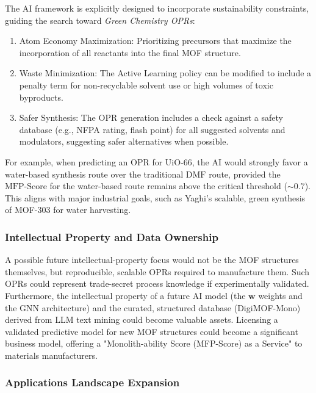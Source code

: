 \documentclass[12pt,a4paper]{article}
\begin{document}
The AI framework is explicitly designed to incorporate sustainability constraints, guiding the search toward \textit{Green Chemistry OPRs}:
\begin{enumerate}
    \item Atom Economy Maximization: Prioritizing precursors that maximize the incorporation of all reactants into the final MOF structure.
    \item Waste Minimization: The Active Learning policy can be modified to include a penalty term for non-recyclable solvent use or high volumes of toxic byproducts.
    \item Safer Synthesis: The OPR generation includes a check against a safety database (e.g., NFPA rating, flash point) for all suggested solvents and modulators, suggesting safer alternatives when possible.
\end{enumerate}
For example, when predicting an OPR for $\text{UiO-66}$, the AI would strongly favor a water-based synthesis route\cite{ref41} over the traditional $\text{DMF}$ route, provided the $\text{MFP-Score}$ for the water-based route remains above the critical threshold ($\sim 0.7$). This aligns with major industrial goals, such as Yaghi's scalable, green synthesis of MOF-303 for water harvesting.\cite{ref42}

\subsubsection{Intellectual Property and Data Ownership}

A possible future intellectual-property focus would not be the MOF structures themselves, but reproducible, scalable OPRs required to manufacture them. Such OPRs could represent trade-secret process knowledge if experimentally validated. Furthermore, the intellectual property of a future AI model (the $\mathbf{w}$ weights and the GNN architecture) and the curated, structured database (DigiMOF-Mono)\cite{ref16} derived from LLM text mining\cite{ref3} could become valuable assets. Licensing a validated predictive model for new MOF structures could become a significant business model, offering a "Monolith-ability Score (MFP-Score) as a Service" to materials manufacturers.

\subsubsection{Applications Landscape Expansion}
\end{document}
